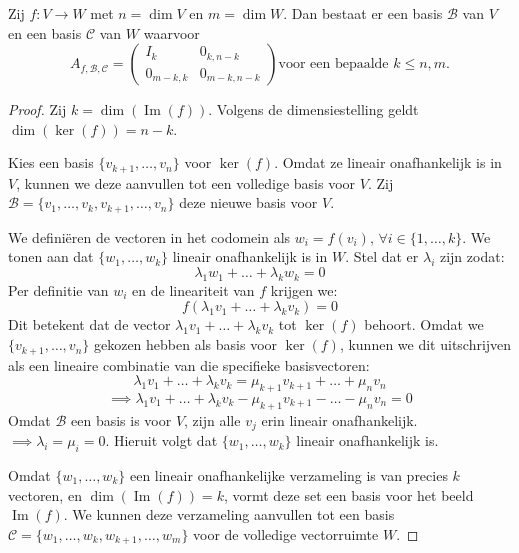 \begin{stelling}[4.2.8]
    Zij $f \colon V \to W$ met $n = \dim V$ en $m = \dim W$. Dan bestaat er een basis $\mathcal{B}$ van $V$ en een basis $\mathcal{C}$ van $W$ waarvoor
    \[ A_{f,\mathcal{B},\mathcal{C}} = \left(\begin{array}{c|c}
        I_k & 0_{k,n-k} \\ \hline
        0_{m-k,k} & 0_{m-k,n-k}
    \end{array}\right) \text{voor een bepaalde } k \le n, m. \]
\end{stelling}
\begin{proof}
    Zij $k = \dim(\operatorname{Im}(f))$. Volgens de dimensiestelling geldt $\dim(\ker(f)) = n - k$.

    Kies een basis $\{v_{k+1}, \dots, v_n\}$ voor $\ker(f)$. Omdat ze lineair onafhankelijk is in $V$, kunnen we deze aanvullen tot een volledige basis voor $V$. 
    Zij $\mathcal{B} = \{v_1, \dots, v_k, v_{k+1}, \dots, v_n\}$ deze nieuwe basis voor $V$.

    We definiëren de vectoren in het codomein als $w_i = f(v_i), \, \forall i \in \{ 1, \dots, k\}$.
    We tonen aan dat $\{w_1, \dots, w_k\}$ lineair onafhankelijk is in $W$.
    Stel dat er $\lambda_i$ zijn zodat:
    $$\lambda_1 w_1 + \dots + \lambda_k w_k = 0$$
    Per definitie van $w_i$ en de lineariteit van $f$ krijgen we:
    $$f(\lambda_1 v_1 + \dots + \lambda_k v_k) = 0$$
    Dit betekent dat de vector $\lambda_1 v_1 + \dots + \lambda_k v_k$ tot $\ker(f)$ behoort. Omdat we $\{v_{k+1}, \dots, v_n\}$ gekozen hebben als basis voor $\ker(f)$, kunnen we dit uitschrijven als een lineaire combinatie van die specifieke basisvectoren:
    $$\lambda_1 v_1 + \dots + \lambda_k v_k = \mu_{k+1} v_{k+1} + \dots + \mu_n v_n$$
    $$\implies\lambda_1 v_1 + \dots + \lambda_k v_k - \mu_{k+1} v_{k+1} - \dots - \mu_n v_n = 0$$
    Omdat $\mathcal{B}$ een basis is voor $V$, zijn alle $v_j$ erin lineair onafhankelijk. \(\implies \lambda_i = \mu_i = 0\).  Hieruit volgt dat $\{w_1, \dots, w_k\}$ lineair onafhankelijk is.

    Omdat $\{w_1, \dots, w_k\}$ een lineair onafhankelijke verzameling is van precies $k$ vectoren, en $\dim(\operatorname{Im}(f)) = k$, vormt deze set een basis voor het beeld $\operatorname{Im}(f)$.
    We kunnen deze verzameling aanvullen tot een basis $\mathcal{C} = \{w_1, \dots, w_k, w_{k+1}, \dots, w_m\}$ voor de volledige vectorruimte $W$.


\end{proof}
